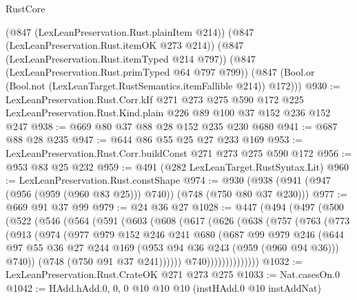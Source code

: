 \begin{lexlean}{RustCore}
\begin{coremodule}
      (@847 (LexLeanPreservation.Rust.plainItem @214))
      (@847 (LexLeanPreservation.Rust.itemOK @273 @214))
      (@847 (LexLeanPreservation.Rust.itemTyped @214 @797))
      (@847 (LexLeanPreservation.Rust.primTyped @64 @797 @799))
      (@847 (Bool.or (Bool.not (LexLeanTarget.RustSemantics.itemFallible @214)) @172)))
@930 := LexLeanPreservation.Rust.Corr.kIf
    @271
    @273
    @275
    @590
    @172
    @225
    LexLeanPreservation.Rust.Kind.plain
    @226
    @89
    @100
    @37
    @152
    @236
    @152
    @247
@938 := @669 @80 @37 @88 @28 @152 @235 @230 @680
@941 := @687 @88 @28 @235
@947 := @644 @86 @55 @25 @27 @233 @169
@953 := LexLeanPreservation.Rust.Corr.buildConst @271 @273 @275 @590 @172
@956 := @953 @83 @25 @232
@959 := @491 (@282 LexLeanTarget.RustSyntax.Lit)
@960 := LexLeanPreservation.Rust.constShape
@974 := @930 (@938 (@941 (@947 (@956 (@959 (@960 @83 @25))) @740)) (@748 (@750 @80 @37 @230)))
@977 := @669 @91 @37 @99
@979 := @24 @36 @27
@1028 := @447
    (@494
      (@497
        (@500
          (@522
            (@546
              (@564
                (@591
                  (@603
                    (@608
                      (@617
                        (@626
                          (@638
                            (@757
                              (@763
                                (@773
                                  (@913
                                    (@974
                                      (@977
                                        @979
                                        @152
                                        @246
                                        @241
                                        @680
                                        (@687
                                          @99
                                          @979
                                          @246
                                          (@644
                                            @97
                                            @55
                                            @36
                                            @27
                                            @244
                                            @169
                                            (@953 @94 @36 @243 (@959 (@960 @94 @36)))
                                            @740))
                                        (@748 (@750 @91 @37 @241))))))
                                @740))))))))))))))
@1032 := LexLeanPreservation.Rust.CrateOK @271 @273 @275
@1033 := Nat.casesOn.{0}
@1042 := HAdd.hAdd.{0, 0, 0} @10 @10 @10 (instHAdd.{0} @10 instAddNat)

\end{coremodule}
\end{lexlean}
